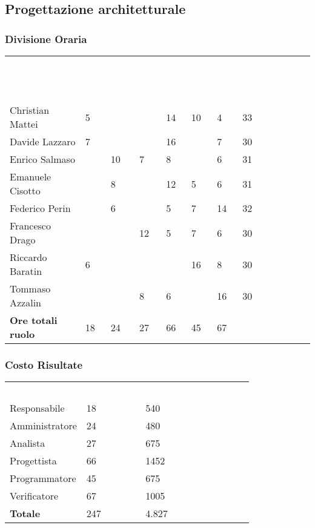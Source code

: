 \subsection{Progettazione architetturale}

\subsubsection{Divisione Oraria}
{
	\renewcommand{\arraystretch}{2}
	\centering
	\begin{longtable}{ C{5cm} C{1cm} C{1cm} C{1cm} C{1cm} C{1cm} C{1cm} C{3cm}}
		\textcolor{white}{\textbf{Nome membro del gruppo}} & \textcolor{white}{\textbf{RE}} & \textcolor{white}{\textbf{AM}} & \textcolor{white}{\textbf{AN}} & \textcolor{white}{\textbf{PT}} & \textcolor{white}{\textbf{PR}} & \textcolor{white}{\textbf{VE}} & \textcolor{white}{\textbf{Ore complessive}}\\	
        
        Christian Mattei & 5 & & & 14 & 10 & 4 & 33\\
        Davide Lazzaro & 7 & & & 16 & & 7 & 30 \\
        Enrico Salmaso & & 10 & 7 & 8 & & 6 & 31 \\
        Emanuele Cisotto & & 8 & & 12 & 5 & 6 & 31 \\
        Federico Perin & & 6 & & 5 & 7 & 14 &  32\\
        Francesco Drago & & & 12 & 5 & 7 & 6 & 30 \\
        Riccardo Baratin & 6 & & & & 16 & 8 & 30\\
        Tommaso Azzalin & & & 8 & 6 & & 16 & 30\\
        \textbf{Ore totali ruolo} & 18 & 24 & 27 & 66 & 45 & 67 & \\
		
	\end{longtable}
}

\subsubsection{Costo Risultate}
{
	\renewcommand{\arraystretch}{2}
	\centering
	\begin{longtable}{ C{3cm} C{2cm} C{4cm}}
		\textcolor{white}{\textbf{Ruolo}} & \textcolor{white}{\textbf{Totale ore}} & \textcolor{white}{\textbf{Costo Ruolo in euro}}\\	
        
        Responsabile & 18 & 540 \\
        Amministratore & 24 & 480 \\
        Analista & 27 & 675 \\
        Progettista & 66 & 1452 \\
        Programmatore & 45 & 675 \\
        Verificatore & 67 & 1005 \\
        \textbf{Totale} & 247 & 4.827 \\
		
	\end{longtable}
}

